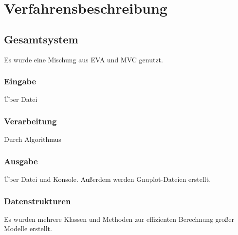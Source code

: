 \chapter{Verfahrensbeschreibung}\label{ch:verfahrensbeschreibung}


\section{Gesamtsystem}\label{sec:gesamtsystem}
Es wurde eine Mischung aus EVA und MVC genutzt.

\subsection{Eingabe}\label{subsec:eingabe}
Über Datei
\subsection{Verarbeitung}\label{subsec:verarbeitung}
Durch Algorithmus
\subsection{Ausgabe}\label{subsec:ausgabe}
Über Datei und Konsole.
Außerdem werden Gnuplot-Dateien erstellt.
\subsection{Datenstrukturen}\label{subsec:datenstrukt}
Es wurden mehrere Klassen und Methoden zur effizienten Berechnung großer Modelle erstellt.
